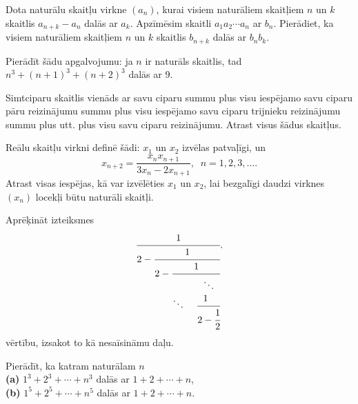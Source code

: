 \documentclass[a4paper,12pt]{article}
\begin{document}
\vspace{10pt}
\begin{problem}
Dota naturālu skaitļu virkne $\left(a_n \right)$, 
kurai visiem naturāliem skaitļiem $n$ un $k$ skaitlis $a_{n+k} - a_n$ dalās ar $a_k$. 
Apzīmēsim skaitli $a_1a_2\cdots{}a_n$ ar $b_n$. 
Pierādiet, ka visiem naturāliem skaitļiem $n$ un $k$ skaitlis $b_{n+k}$ dalās ar $b_nb_k$.
\end{problem}


\vspace{10pt}
\begin{problem}
Pierādīt šādu apgalvojumu: ja $n$ ir naturāls skaitlis, tad $n^3 + (n+1)^3 + (n+2)^3$ dalās ar $9$.
\end{problem}


\vspace{10pt}
\begin{problem}
Simtciparu skaitlis vienāds ar savu ciparu summu plus visu iespējamo savu ciparu pāru reizinājumu summu 
plus visu iespējamo savu ciparu trijnieku reizinājumu summu plus utt. plus visu savu ciparu reizinājumu. 
Atrast visus šādus skaitļus.
\end{problem}


\vspace{10pt}
\begin{problem}
Reālu skaitļu virkni definē šādi: $x_1$ un $x_2$ izvēlas patvaļīgi, un
$$x_{n+2} = \frac{x_nx_{n+1}}{3x_n - 2x_{n+1}},\;\;n=1,2,3,\ldots .$$
Atrast visas iespējas, kā var izvēlēties $x_1$ un $x_2$, lai bezgalīgi daudzi virknes $\left( x_n \right)$ 
locekļi būtu naturāli skaitļi.
\end{problem}


\vspace{10pt}
\begin{problem}
Aprēķināt izteiksmes
\[\cfrac{1}{2-\cfrac{1}{2-\cfrac{1}{\ddots\;\;\;\;\cfrac{ \begin{array}{l} \ddots \\ 1 \\ \end{array}  }{2-\cfrac{1}{2}}}}}.\]
vērtību, izsakot to kā nesaīsināmu daļu.
\end{problem}


\vspace{10pt}
\begin{problem}
Pierādīt, ka katram naturālam $n$\\
{\bf (a)} $1^3 + 2^3 + \cdots + n^3$ dalās ar $1 + 2 + \cdots +n$,\\
{\bf (b)} $1^5 + 2^5 + \cdots + n^5$ dalās ar $1 + 2 + \cdots +n$.
\end{problem}
\end{document}
